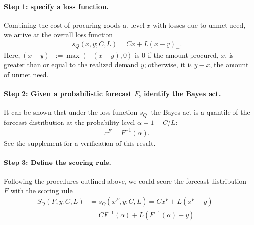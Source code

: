 \documentclass{article}
\begin{document}
\paragraph{Step 1: specify a loss function.} Combining the cost of procuring goods at level $x$ with losses due to unmet need, we arrive at the overall loss function
\begin{align}
s_Q(x,y; C, L) = Cx + L(x-y)_-.
\end{align}
Here, $(x - y)_- := \max(-(x - y),0)$ is $0$ if the amount procured, $x$, is greater than or equal to the realized demand $y$; otherwise, it is $y - x$, the amount of unmet need.

\paragraph{Step 2: Given a probabilistic forecast $F$, identify the Bayes act.} It can be shown that under the loss function $s_Q$, the Bayes act is a quantile of the forecast distribution at the probability level $\alpha = 1 - C/L$:
\begin{align}
x^F = F^{-1}(\alpha).
\end{align}
See the supplement for a verification of this result.

\paragraph{Step 3: Define the scoring rule.} Following the procedures outlined above, we could score the forecast distribution $F$ with the scoring rule
\begin{align*}
S_Q(F, y; C, L) &= s_Q(x^F, y; C, L) = Cx^F + L(x^F-y)_- \nonumber \\
&= C F^{-1}(\alpha) + L \left(F^{-1}(\alpha) - y\right)_- \label{eqn:S_Q_CL}
\end{align*}
\end{document}
